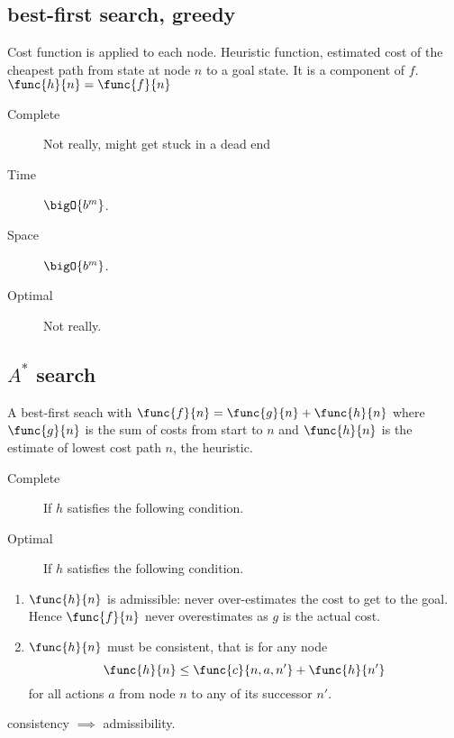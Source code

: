 \subsection{best-first search, greedy} 
Cost function is applied to each node. Heuristic function, estimated cost of the cheapest path from state at node \(n\) to a goal state. It is a component of \(f\). \(\func{h}{n} = \func{f}{n}\)
\begin{description} 
    \item[Complete] Not really, might get stuck in a dead end
    \item[Time] \(\bigO{b^m}\).
    \item[Space] \(\bigO{b^m}\).
    \item[Optimal] Not really.
\end{description}
\subsection{\(A^\ast\) search}
A best-first seach with  \(\func{f}{n} = \func{g}{n} + \func{h}{n}\) where \(\func{g}{n}\) is the sum of costs from start to \(n\) and \(\func{h}{n}\) is the estimate of lowest cost path \(n\), the heuristic.
\begin{description}
    \item[Complete] If \(h\) satisfies the following condition.
    \item[Optimal] If \(h\) satisfies the following condition.
\end{description}
\begin{enumerate}
    \item \(\func{h}{n}\) is admissible: never over-estimates the cost to get to the goal. Hence \(\func{f}{n}\) never overestimates as \(g\) is the actual cost.
    \item \(\func{h}{n}\) must be consistent, that is for any node 
    \begin{equation*}
        \func{h}{n} \leq \func{c}{n,a,n'} + \func{h}{n'}
    \end{equation*}
    for all actions \(a\) from node \(n\) to any of its successor \(n'\).
\end{enumerate}
\begin{proposition}
    consistency \(\implies\) admissibility.
\end{proposition}

